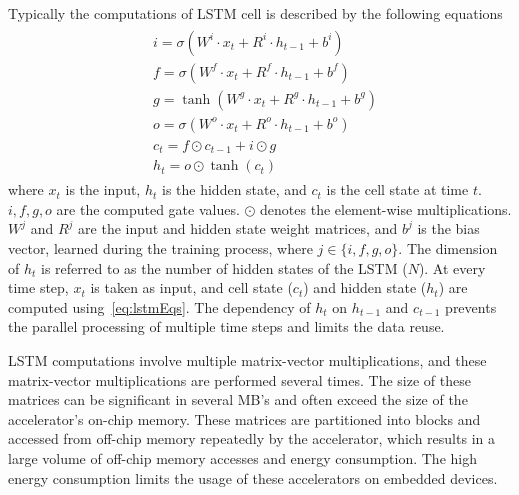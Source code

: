 \documentclass[a4paper,10pt]{article}
\begin{document}
Typically the computations of LSTM cell is described by the following equations
\begin{align}\label{eq:lstmEqs}
	\begin{split}
		&i{=}{\sigma}(W^i{\cdot}x_t{+}R^i{\cdot}h_{t-1}{+}b^i)\\
		&f{=}{\sigma}(W^f{\cdot}x_t{+}R^f{\cdot}h_{t-1}{+}b^f)\\
		&g{=}{\tanh}(W^g{\cdot}x_t{+}R^g{\cdot}h_{t-1}{+}b^g)\\
		&o{=}{\sigma}(W^o{\cdot}x_t{+}R^o{\cdot}h_{t-1}{+}b^o)\\
		&c_{t}{=}f{\odot}c_{t-1}{+}i{\odot}g\\
		&h_{t}{=}o{\odot}{\tanh}(c_t)
	\end{split}	
\end{align}
where $x_t$ is the input, $h_t$ is the hidden state, and $c_t$ is the cell state at time $t$. $i,f,g,o$ are the computed gate values. $\odot$ denotes the element-wise multiplications. $W^j$ and $R^j$ are the input and hidden state weight matrices, and $b^j$ is the bias vector, learned during the training process, where $j\in\{i,f,g,o\}$. The dimension of $h_t$ is referred to as the number of hidden states of the LSTM ($N$). 
At every time step, $x_t$ is taken as input, and cell state ($c_t$) and hidden state ($h_t$) are computed using~\eqref{eq:lstmEqs}. The dependency of $h_t$ on $h_{t-1}$ and $c_{t-1}$ prevents the parallel processing of multiple time steps and limits the data reuse. 

LSTM computations involve multiple matrix-vector multiplications, and these matrix-vector multiplications are performed several times. The size of these matrices can be significant in several MB's and often exceed the size of the accelerator's on-chip memory. These matrices are partitioned into blocks and accessed from off-chip memory repeatedly by the accelerator, which results in a large volume of off-chip memory accesses and energy consumption. The high energy consumption limits the usage of these accelerators on embedded devices.
\end{document}
